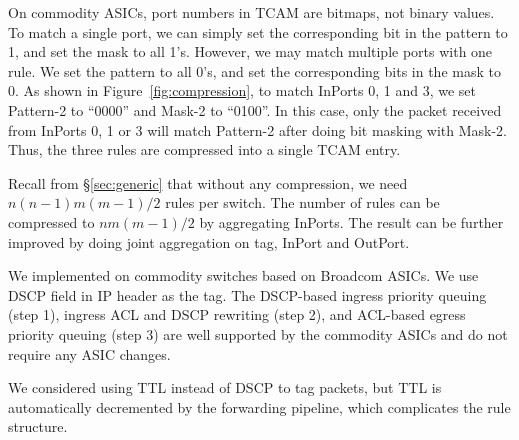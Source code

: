 On commodity ASICs, port numbers in TCAM are bitmaps, not binary values. To match a single 
port, we can simply set the corresponding bit in the pattern to 1, and set the mask to all 1's. 
However, we may match multiple ports with one rule. We set the pattern to 
all 0's, and set the corresponding bits in the mask to 0. As shown in Figure~\ref{fig:compression},  
to match InPorts 0, 1 and 3, we set Pattern-2 to ``0000''  and Mask-2 to ``0100''. In this case, 
only the packet received from InPorts 0, 1 or 3 will match Pattern-2 after doing bit masking with Mask-2. 
Thus, the three rules are compressed into a single TCAM entry.

Recall from \S\ref{sec:generic} that without any compression, we need
$n(n-1)m(m-1)/2$ rules per switch. The number of rules can be
compressed to $nm(m-1)/2$ by aggregating InPorts.  The
result can be further improved by doing joint aggregation on tag, InPort and
OutPort.

 We implemented \sysname{} on commodity
switches based on Broadcom ASICs.  We use DSCP field in IP header as the tag.
The DSCP-based ingress priority queuing (step 1), ingress ACL and DSCP rewriting (step 2),
and ACL-based egress priority queuing (step 3) are well supported by the
commodity ASICs and do not require any ASIC changes. 





We considered using TTL instead of DSCP to tag packets, but TTL is automatically 
decremented by the forwarding pipeline, which complicates the rule structure.

